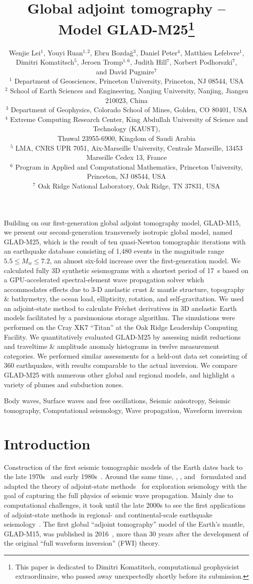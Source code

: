 \documentclass[extra,mreferee]{gji}
\title[Global Adjoint Tomography -- Model GLAD-M25]
  {Global adjoint tomography -- Model GLAD-M25\footnote{This paper is dedicated to Dimitri Komatitsch, computational geophysicist extraordinaire, who passed away unexpectedly shortly before its submission.}}
\author[Lei et al.]
  {Wenjie Lei$^1$, Youyi Ruan$^{1,2}$, Ebru Bozda\u g$^3$, Daniel Peter$^4$, Matthieu Lefebvre$^1$, \\{\LARGE \rm Dimitri Komatitsch$^5$, Jeroen Tromp$^{1,6}$, Judith Hill$^7$, Norbert Podhorszki$^7$}, \\ {\LARGE \rm and David Pugmire$^7$} \\
  $^1$ Department of Geosciences, Princeton University, Princeton, NJ 08544, USA\\
  $^2$ School of Earth Sciences and Engineering, Nanjing University, Nanjing, Jiangsu 210023, China\\
  $^3$ Department of Geophysics, Colorado School of Mines, Golden, CO 80401, USA\\
  $^4$ Extreme Computing Research Center, King Abdullah University of Science and Technology (KAUST), \\Thuwal 23955-6900, Kingdom of Saudi Arabia\\
  $^5$ LMA, CNRS UPR 7051, Aix-Marseille University, Centrale Marseille, 13453 Marseille Cedex 13, France\\
  $^6$ Program in Applied and Computational Mathematics, Princeton University, Princeton, NJ 08544, USA\\
  $^7$ Oak Ridge National Laboratory, Oak Ridge, TN 37831, USA\\
  }
\begin{document}
\maketitle

%
%
\begin{summary}
Building on our first-generation global adjoint tomography model,
GLAD-M15, we present our second-generation transversely isotropic global model,
named GLAD-M25, which is the result of ten quasi-Newton tomographic iterations with an
earthquake database consisting of 1,480 events in the magnitude range $5.5\le M_w \le 7.2$,
an almost six-fold increase over the first-generation model.
We calculated fully 3D synthetic seismograms with a shortest period of 17~s based on a GPU-accelerated spectral-element wave
propagation solver which accommodates effects due to 3-D anelastic crust \& mantle structure, topography \& bathymetry, the ocean load, ellipticity, rotation, and self-gravitation.
We used an adjoint-state method to calculate Fr\'echet derivatives in 3D anelastic Earth models
facilitated by a parsimonious storage algorithm.
The simulations were performed on the Cray XK7 ``Titan'' at the Oak Ridge Leadership Computing Facility.
We quantitatively evaluated GLAD-M25 by assessing misfit reductions and traveltime \& amplitude anomaly histograms in twelve measurement
categories.
We performed similar assessments for a held-out data set consisting of 360 earthquakes,
with results comparable to the actual inversion.
We compare GLAD-M25 with numerous other global and regional models,
and highlight a variety of plumes and subduction zones.
\end{summary}

\begin{keywords}
Body waves, Surface waves and free oscillations, Seismic anisotropy, Seismic tomography, Computational seismology, Wave propagation, Waveform inversion
\end{keywords}

\section{Introduction}

Construction of the first seismic tomographic models of the Earth dates back to the late 1970s~\citep{Aki77,Dziewonski77,SenTok77} and early 1980s~\citep[e.g.,][]{WD84,Nataf1984}.
Around the same time,
\cite{BaChLa77}, \cite{Lailly1983}, and~\cite{Tar84} formulated and adapted the theory of adjoint-state methods~\citep{Chavent1974} for exploration seismology with the goal of capturing the full physics of seismic wave propagation.
Mainly due to computational challenges,
it took until the late 2000s to see the first applications of adjoint-state methods in regional- and continental-scale earthquake seismology~\citep{tape2009adjoint,Fichtner09,zhu2012structure}.
The first global ``adjoint tomography'' model of the Earth's mantle,
GLAD-M15, was published in 2016~\citep{bozdaug2016global}, more than 30 years after the development of the original ``full waveform inversion'' (FWI) theory.
\end{document}
